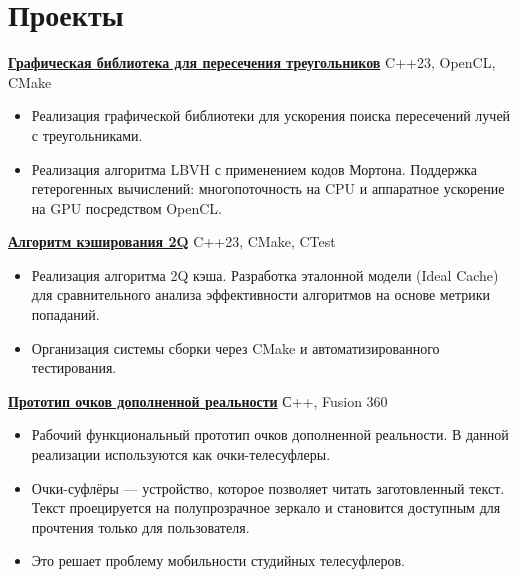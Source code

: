 \documentclass[a4paper,12pt]{article}
\begin{document}
\vspace{1.25em}

\section{Проекты}

\href{https://github.com/HaipoviyPodrostok/Triangles} {\textbf{\color{primary} Графическая библиотека для пересечения треугольников}} \faGithub
\hfill \textcolor{secondary}{C++23, OpenCL, CMake}
\begin{itemize}
\item Реализация графической библиотеки для ускорения поиска пересечений лучей с треугольниками.
\item Реализация алгоритма LBVH с применением кодов Мортона. Поддержка гетерогенных вычислений: многопоточность на CPU и аппаратное ускорение на GPU посредством OpenCL.
\end{itemize}

\vspace{1.25em}

\href{https://github.com/HaipoviyPodrostok/Cache} {\textbf{\color{primary} Алгоритм кэширования 2Q}} \faGithub
\hfill \textcolor{secondary}{C++23, CMake, CTest}
\begin{itemize}
\item Реализация алгоритма 2Q кэша. Разработка эталонной модели (Ideal Cache) для сравнительного анализа эффективности алгоритмов на основе метрики попаданий.
\item Организация системы сборки через CMake и автоматизированного тестирования.
\end{itemize}

\vspace{1.25em}

\href{https://github.com/HaipoviyPodrostok/Prompter-glasses} {\textbf{\color{primary} Прототип очков дополненной реальности}} \faGithub
\hfill \textcolor{secondary}{С++, Fusion 360}
\begin{itemize}
\item Рабочий функциональный прототип очков дополненной реальности. В данной реализации используются как очки-телесуфлеры. 
\item Очки-суфлёры — устройство, которое позволяет читать заготовленный текст. Текст проецируется на полупрозрачное зеркало и становится доступным для прочтения только для пользователя. 
\item Это решает проблему мобильности студийных телесуфлеров.

\end{itemize}
\end{document}
